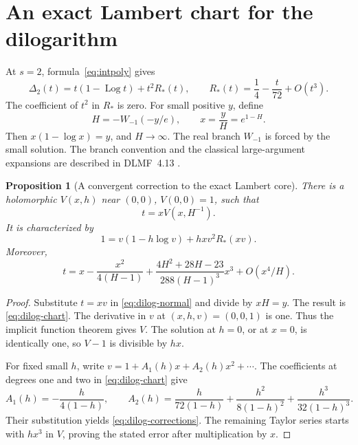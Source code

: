 \documentclass[11pt,a4paper]{article}
\numberwithin{equation}{section}
\newtheorem{proposition}[theorem]{Proposition}
\theoremstyle{definition}
\theoremstyle{remark}
\DeclareMathOperator{\Log}{Log}
\begin{document}
\section{An exact Lambert chart for the dilogarithm}
\label{sec:lambert}

At \(s=2\), formula~\eqref{eq:intpoly} gives
\begin{equation}
 \Delta_2(t)=t(1-\Log t)+t^2R_*(t),\qquad
 R_*(t)=\frac14-\frac{t}{72}+O(t^3).
 \label{eq:dilog-normal}
\end{equation}
The coefficient of \(t^2\) in \(R_*\) is zero.
For small positive \(y\), define
\begin{equation}
 H=-W_{-1}(-y/e),\qquad x=\frac yH=e^{1-H}.
 \label{eq:Lambertcore}
\end{equation}
Then \(x(1-\log x)=y\), and \(H\to\infty\).
The real branch \(W_{-1}\) is forced by the small solution.
The branch convention and the classical large-argument expansions are
described in DLMF~4.13 \cite{dlmf-w}.

\begin{proposition}[A convergent correction to the exact Lambert core]
\label{prop:dilog-chart}
There is a holomorphic \(V(x,h)\) near \((0,0)\), \(V(0,0)=1\), such that
\[
 t=xV(x,H^{-1}).
\]
It is characterized by
\begin{equation}
 1=v(1-h\log v)+h x v^2R_*(xv).
 \label{eq:dilog-chart}
\end{equation}
Moreover,
\begin{equation}
 t=x-\frac{x^2}{4(H-1)}
 +\frac{4H^2+28H-23}{288(H-1)^3}x^3
 +O(x^4/H).
 \label{eq:dilog-corrections}
\end{equation}
\end{proposition}

\begin{proof}
Substitute \(t=xv\) in \eqref{eq:dilog-normal} and divide by \(xH=y\).
The result is \eqref{eq:dilog-chart}.
The derivative in \(v\) at \((x,h,v)=(0,0,1)\) is one.
Thus the implicit function theorem gives \(V\).
The solution at \(h=0\), or at \(x=0\), is identically one, so \(V-1\)
is divisible by \(hx\).

For fixed small \(h\), write \(v=1+A_1(h)x+A_2(h)x^2+\cdots\).
The coefficients at degrees one and two in
\eqref{eq:dilog-chart} give
\[
 A_1(h)=-\frac{h}{4(1-h)},\qquad
 A_2(h)=
 \frac{h}{72(1-h)}
 +\frac{h^2}{8(1-h)^2}
 +\frac{h^3}{32(1-h)^3}.
\]
Their substitution yields \eqref{eq:dilog-corrections}.
The remaining Taylor series starts with \(hx^3\) in \(V\), proving
the stated error after multiplication by \(x\).
\end{proof}
\end{document}
